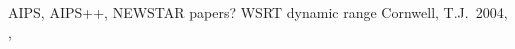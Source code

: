 \documentclass[11pt,twoside]{article}  %
\begin{document}
%
% 
%
%
\begin{references}

AIPS, AIPS++, NEWSTAR papers?
 WSRT dynamic range
 Cornwell, T.J.\ 2004, \adassxiii, 

\end{references}

\end{document}

